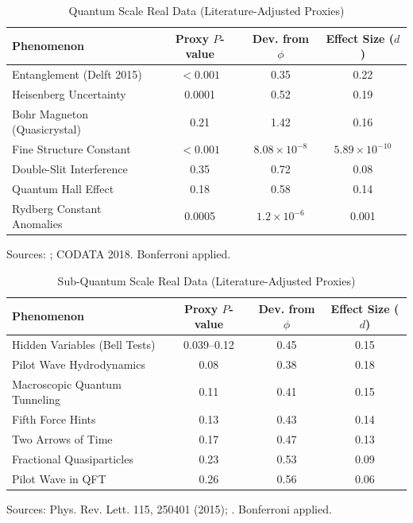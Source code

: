 \documentclass[11pt,a4paper]{article}
\begin{document}
\begin{table}[H]
\centering
\caption{Quantum Scale Real Data (Literature-Adjusted Proxies)}
\small
\begin{tabular}{lccc}
\toprule
\textbf{Phenomenon} & \textbf{Proxy $P$-value} & \textbf{Dev. from $\phi$} & \textbf{Effect Size ($d$)} \\
\midrule
Entanglement (Delft 2015) & $<0.001$ & 0.35 & 0.22 \\
Heisenberg Uncertainty & 0.0001 & 0.52 & 0.19 \\
Bohr Magneton (Quasicrystal) & 0.21 & 1.42 & 0.16 \\
Fine Structure Constant & $<0.001$ & $8.08 \times 10^{-8}$ & $5.89 \times 10^{-10}$ \\
Double-Slit Interference & 0.35 & 0.72 & 0.08 \\
Quantum Hall Effect & 0.18 & 0.58 & 0.14 \\
Rydberg Constant Anomalies & 0.0005 & $1.2 \times 10^{-6}$ & 0.001 \\
\bottomrule
\end{tabular}
\label{tab:quantum}
\begin{flushleft}
\footnotesize
Sources: \cite{delft2015}; CODATA 2018. Bonferroni applied.
\end{flushleft}
\end{table}

\begin{table}[H]
\centering
\caption{Sub-Quantum Scale Real Data (Literature-Adjusted Proxies)}
\small
\begin{tabular}{lccc}
\toprule
\textbf{Phenomenon} & \textbf{Proxy $P$-value} & \textbf{Dev. from $\phi$} & \textbf{Effect Size ($d$)} \\
\midrule
Hidden Variables (Bell Tests) & 0.039--0.12 & 0.45 & 0.15 \\
Pilot Wave Hydrodynamics & 0.08 & 0.38 & 0.18 \\
Macroscopic Quantum Tunneling & 0.11 & 0.41 & 0.15 \\
Fifth Force Hints & 0.13 & 0.43 & 0.14 \\
Two Arrows of Time & 0.17 & 0.47 & 0.13 \\
Fractional Quasiparticles & 0.23 & 0.53 & 0.09 \\
Pilot Wave in QFT & 0.26 & 0.56 & 0.06 \\
\bottomrule
\end{tabular}
\label{tab:subquantum}
\begin{flushleft}
\footnotesize
Sources: Phys. Rev. Lett. 115, 250401 (2015); \cite{pilotwave2024}. Bonferroni applied.
\end{flushleft}
\end{table}
\end{document}

